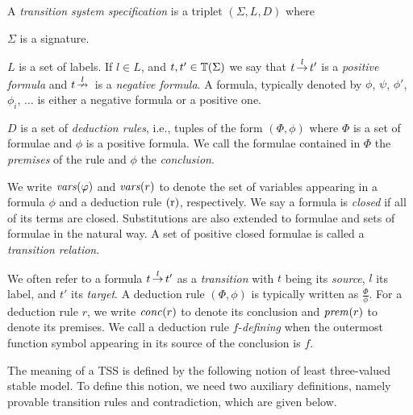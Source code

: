 \begin{definition}
    A \emph{transition system specification} is a triplet $(\Sigma, L, D)$ where
    \begin{bullets}
        \item $\Sigma$ is a signature.
        \item $L$ is a set of labels. If $l \in L$, and $t,t'\in \mathbb{T}(\Sigma)$
              we say that $t \,{\stackrel{{l}}{\rightarrow}}\, t'$ is a \emph{positive formula} and
              $t \,{\stackrel{{l}}{\nrightarrow}}\,$ is a \emph{negative formula}. A formula, typically denoted by $\phi$, $\psi$, $\phi'$, $\phi_i$, $\ldots$
              is either a negative formula or a positive one.
        \item $D$ is a set of \emph{deduction rules}, i.e., tuples of the form $(\Phi,\phi)$ where $\Phi$ is a set of
              formulae and $\phi$ is a positive formula. We call the formulae contained in $\Phi$ the \emph{premises} of the rule and $\phi$ the
              \emph{conclusion}.
    \end{bullets}
    We write $\mathit{vars}(\varphi)$ and $\mathit{vars}(r)$ to denote the set of variables appearing in a formula $\phi$ and a deduction rule $\mathrm{(r)}$, respectively.
    We say a formula is \emph{closed} if all of its terms are closed. Substitutions are also extended to formulae
    and sets of formulae in the natural way. A set of positive closed formulae is called a \emph{transition relation}.
\end{definition}

We often refer to a formula $t \,{\stackrel{{l}}{\rightarrow}}\, t'$ as a \emph{transition} with $t$ being its \emph{source}, $l$ its label, and $t'$
its \emph{target}.
A deduction rule $(\Phi,\phi)$ is typically written as $\frac{\Phi}{\phi}$. For a deduction rule $r$, we write $\mathit{conc}(r)$ to denote its conclusion and $\mathit{prem}(r)$ to denote its premises.
We call a deduction rule $f$-\emph{defining} when the outermost function symbol appearing in its source of the conclusion is $f$.


The meaning of a TSS is defined by the following notion of least three-valued stable model.
To define this notion, we need two auxiliary definitions, namely provable transition rules and contradiction, which are given below.

